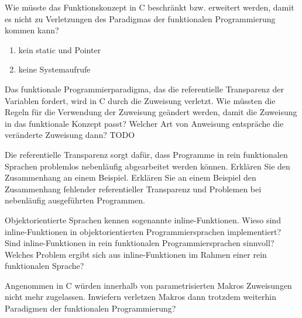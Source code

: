 \begin{card}
	Wie müsste das Funktionskonzept in C beschränkt bzw. erweitert werden, damit es nicht zu Verletzungen des Paradigmas der funktionalen Programmierung kommen kann?
	\hr
	\begin{enumerate}
	\item kein static und Pointer 
	\item keine Systemaufrufe
	\end{enumerate}
\end{card}

\begin{card}
	Das funktionale Programmierparadigma, das die referentielle Transparenz der Variablen fordert, wird in C durch die Zuweisung verletzt. Wie müssten die Regeln für die Verwendung der Zuweisung geändert werden, damit die	Zuweisung in das funktionale Konzept passt? 
	\hr
	Welcher Art von Anweisung entspräche die veränderte Zuweisung dann? 
	TODO
\end{card}

\begin{card}
	Die referentielle Transparenz sorgt dafür, dass Programme in rein funktionalen Sprachen	problemlos nebenläufig abgearbeitet werden können. 
	Erklären Sie den Zusammenhang an einem Beispiel.
	Erklären Sie an einem Beispiel den Zusammenhang fehlender referentieller Transparenz und Problemen bei nebenläufig ausgeführten Programmen. 
\end{card}

\begin{card}
	Objektorientierte Sprachen kennen sogenannte inline-Funktionen.
	Wieso sind inline-Funktionen in objektorientierten Programmiersprachen implementiert?
	Sind inline-Funktionen in rein funktionalen Programmiersprachen sinnvoll?
	Welches Problem ergibt sich aus inline-Funktionen im Rahmen einer rein funktionalen	Sprache? 
\end{card}

\begin{card}
	Angenommen in C würden innerhalb von parametrisierten Makros Zuweisungen nicht mehr	zugelassen.	Inwiefern verletzen Makros dann trotzdem weiterhin Paradigmen der funktionalen Programmierung? 
\end{card}